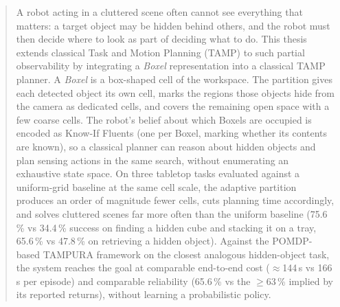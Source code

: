 
\begin{abstract}
A robot acting in a cluttered scene often cannot see everything that
matters: a target object may be hidden behind others, and the robot must
then decide where to look as part of deciding what to do. This thesis
extends classical Task and Motion Planning (TAMP) to such partial
observability by integrating a \emph{Boxel} representation into a
classical TAMP planner. A \emph{Boxel} is a box-shaped cell of the workspace.
The partition gives each detected object its own cell, marks the regions
those objects hide from the camera as dedicated cells, and covers the
remaining open space with a few coarse cells. The robot's belief about which Boxels are occupied is encoded as Know-If
Fluents (one per Boxel, marking whether its contents are known), so a
classical planner can reason about hidden objects and plan sensing actions in
the same search, without enumerating an exhaustive state space. On three
tabletop tasks evaluated against a uniform-grid baseline at the same cell
scale, the adaptive partition produces an order of magnitude fewer cells, cuts
planning time accordingly, and solves cluttered scenes far more often than the uniform baseline (75.6\,\% vs 34.4\,\% success on finding a hidden cube and stacking it on a tray, 65.6\,\% vs 47.8\,\% on retrieving a hidden object). Against the POMDP-based TAMPURA framework on the closest analogous hidden-object task, the system reaches the goal at comparable end-to-end cost ($\approx$144\,s vs 166\,s per episode) and comparable reliability (65.6\,\% vs the $\geq$63\,\% implied by its reported returns), without learning a probabilistic policy.
\end{abstract}
